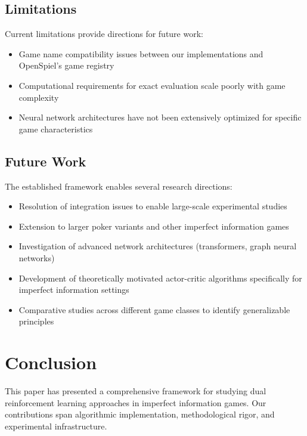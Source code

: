 \documentclass[10pt,twocolumn,conference]{IEEEtran}
\begin{document}
\subsection{Limitations}
Current limitations provide directions for future work:
\begin{itemize}
    \item Game name compatibility issues between our implementations and OpenSpiel's game registry
    \item Computational requirements for exact evaluation scale poorly with game complexity
    \item Neural network architectures have not been extensively optimized for specific game characteristics
\end{itemize}

\subsection{Future Work}
The established framework enables several research directions:
\begin{itemize}
    \item Resolution of integration issues to enable large-scale experimental studies
    \item Extension to larger poker variants and other imperfect information games
    \item Investigation of advanced network architectures (transformers, graph neural networks)
    \item Development of theoretically motivated actor-critic algorithms specifically for imperfect information settings
    \item Comparative studies across different game classes to identify generalizable principles
\end{itemize}

\section{Conclusion}
\label{sec:conclusion}

This paper has presented a comprehensive framework for studying dual reinforcement learning approaches in imperfect information games. Our contributions span algorithmic implementation, methodological rigor, and experimental infrastructure.
\end{document}
